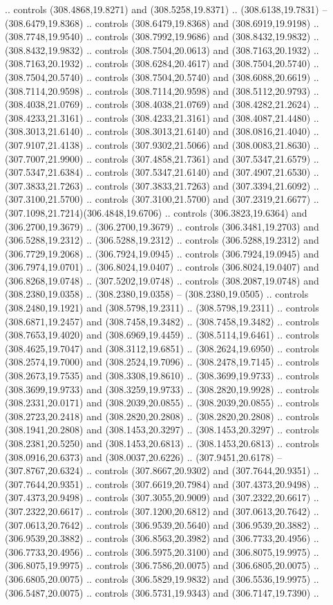 .. controls (308.4868,19.8271) and (308.5258,19.8371) .. (308.6138,19.7831) -- (308.6479,19.8368) .. controls (308.6479,19.8368) and (308.6919,19.9198) .. (308.7748,19.9540) .. controls (308.7992,19.9686) and (308.8432,19.9832) .. (308.8432,19.9832) .. controls (308.7504,20.0613) and (308.7163,20.1932) .. (308.7163,20.1932) .. controls (308.6284,20.4617) and (308.7504,20.5740) .. (308.7504,20.5740) .. controls (308.7504,20.5740) and (308.6088,20.6619) .. (308.7114,20.9598) .. controls (308.7114,20.9598) and (308.5112,20.9793) .. (308.4038,21.0769) .. controls (308.4038,21.0769) and (308.4282,21.2624) .. (308.4233,21.3161) .. controls (308.4233,21.3161) and (308.4087,21.4480) .. (308.3013,21.6140) .. controls (308.3013,21.6140) and (308.0816,21.4040) .. (307.9107,21.4138) .. controls (307.9302,21.5066) and (308.0083,21.8630) .. (307.7007,21.9900) .. controls (307.4858,21.7361) and (307.5347,21.6579) .. (307.5347,21.6384) .. controls (307.5347,21.6140) and (307.4907,21.6530) .. (307.3833,21.7263) .. controls (307.3833,21.7263) and (307.3394,21.6092) .. (307.3100,21.5700) .. controls (307.3100,21.5700) and (307.2319,21.6677) .. (307.1098,21.7214)(306.4848,19.6706) .. controls (306.3823,19.6364) and (306.2700,19.3679) .. (306.2700,19.3679) .. controls (306.3481,19.2703) and (306.5288,19.2312) .. (306.5288,19.2312) .. controls (306.5288,19.2312) and (306.7729,19.2068) .. (306.7924,19.0945) .. controls (306.7924,19.0945) and (306.7974,19.0701) .. (306.8024,19.0407) .. controls (306.8024,19.0407) and (306.8268,19.0748) .. (307.5202,19.0748) .. controls (308.2087,19.0748) and (308.2380,19.0358) .. (308.2380,19.0358) -- (308.2380,19.0505) .. controls (308.2480,19.1921) and (308.5798,19.2311) .. (308.5798,19.2311) .. controls (308.6871,19.2457) and (308.7458,19.3482) .. (308.7458,19.3482) .. controls (308.7653,19.4020) and (308.6969,19.4459) .. (308.5114,19.6461) .. controls (308.4625,19.7047) and (308.3112,19.6851) .. (308.2624,19.6950) .. controls (308.2574,19.7000) and (308.2524,19.7096) .. (308.2478,19.7145) .. controls (308.2673,19.7535) and (308.3308,19.8610) .. (308.3699,19.9733) .. controls (308.3699,19.9733) and (308.3259,19.9733) .. (308.2820,19.9928) .. controls (308.2331,20.0171) and (308.2039,20.0855) .. (308.2039,20.0855) .. controls (308.2723,20.2418) and (308.2820,20.2808) .. (308.2820,20.2808) .. controls (308.1941,20.2808) and (308.1453,20.3297) .. (308.1453,20.3297) .. controls (308.2381,20.5250) and (308.1453,20.6813) .. (308.1453,20.6813) .. controls (308.0916,20.6373) and (308.0037,20.6226) .. (307.9451,20.6178) -- (307.8767,20.6324) .. controls (307.8667,20.9302) and (307.7644,20.9351) .. (307.7644,20.9351) .. controls (307.6619,20.7984) and (307.4373,20.9498) .. (307.4373,20.9498) .. controls (307.3055,20.9009) and (307.2322,20.6617) .. (307.2322,20.6617) .. controls (307.1200,20.6812) and (307.0613,20.7642) .. (307.0613,20.7642) .. controls (306.9539,20.5640) and (306.9539,20.3882) .. (306.9539,20.3882) .. controls (306.8563,20.3982) and (306.7733,20.4956) .. (306.7733,20.4956) .. controls (306.5975,20.3100) and (306.8075,19.9975) .. (306.8075,19.9975) .. controls (306.7586,20.0075) and (306.6805,20.0075) .. (306.6805,20.0075) .. controls (306.5829,19.9832) and (306.5536,19.9975) .. (306.5487,20.0075) .. controls (306.5731,19.9343) and (306.7147,19.7390) .. 